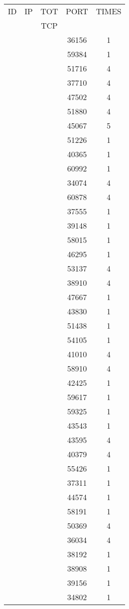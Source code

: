 \documentclass[a4paper]{scrartcl}
\begin{document}
\begin{minipage}[b]{0.5\linewidth}
\begin{tabular}{| c | c | c | c | c |}
\hline
ID & IP & TOT & PORT & TIMES \\ 
   &    & TCP &      &       \\ 
\hline
& & & 36156 & 1 \\ & & & 59384 & 1 \\ & & & 51716 & 4 \\ & & & 37710 & 4 \\ & & & 47502 & 4 \\ & & & 51880 & 4 \\ & & & 45067 & 5 \\ & & & 51226 & 1 \\ & & & 40365 & 1 \\ & & & 60992 & 1 \\ & & & 34074 & 4 \\ & & & 60878 & 4 \\ & & & 37555 & 1 \\ & & & 39148 & 1 \\ & & & 58015 & 1 \\ & & & 46295 & 1 \\ & & & 53137 & 4 \\ & & & 38910 & 4 \\ & & & 47667 & 1 \\ & & & 43830 & 1 \\ & & & 51438 & 1 \\ & & & 54105 & 1 \\ & & & 41010 & 4 \\ & & & 58910 & 4 \\ & & & 42425 & 1 \\ & & & 59617 & 1 \\ & & & 59325 & 1 \\ & & & 43543 & 1 \\ & & & 43595 & 4 \\ & & & 40379 & 4 \\ & & & 55426 & 1 \\ & & & 37311 & 1 \\ & & & 44574 & 1 \\ & & & 58191 & 1 \\ & & & 50369 & 4 \\ & & & 36034 & 4 \\ & & & 38192 & 1 \\ & & & 38908 & 1 \\ & & & 39156 & 1 \\ & & & 34802 & 1 \\ \hline\end{tabular}\end{minipage} \hfill\begin{minipage}[b]{0.5\linewidth}\begin{tabular}{| c | c | c | c | c |}

\end{tabular}
\end{minipage}
\end{document}
